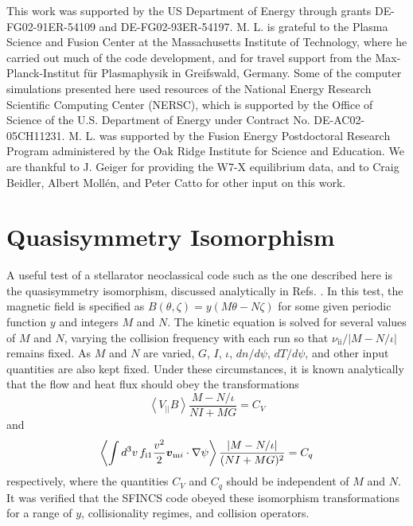 \documentclass[12pt,superscriptaddress]{revtex4}
\newcommand{\vect}[1]{\mbox{\boldmath $#1$}}
\newcommand{\nuii}{\nu_{\mathrm{ii}}}
\begin{document}
\begin{acknowledgments}
This work was supported by the US Department of Energy through grants DE-FG02-91ER-54109 and DE-FG02-93ER-54197.
M. L. is grateful to the Plasma Science and Fusion Center at the Massachusetts Institute of Technology,
where he carried out much of the code development, and for travel support from the
Max-Planck-Institut f\"{u}r Plasmaphysik in Greifswald, Germany.
Some of the computer simulations presented here
used resources of the National Energy Research Scientific Computing Center (NERSC),
which is supported by the Office of Science of the U.S. Department of Energy under Contract No. DE-AC02-05CH11231.
M. L. was supported by the
Fusion Energy Postdoctoral Research Program
administered by the Oak Ridge Institute for Science and Education.
We are thankful to J. Geiger for providing the W7-X equilibrium data,
and to Craig Beidler, Albert Moll\'{e}n, and Peter Catto for other input on this work.
\end{acknowledgments}


\appendix
\section{Quasisymmetry Isomorphism}

A useful test of a stellarator neoclassical code such as the one
described here is the quasisymmetry isomorphism,
discussed analytically in Refs. \cite{Pytte, Boozer83, meQS}.
In this test, the magnetic field is specified as $B(\theta,\zeta) = y(M\theta-N\zeta)$
for some given periodic function $y$ and integers $M$ and $N$.
The kinetic equation is solved for several values of $M$ and $N$,
varying the collision frequency with each run so that
$\nuii / \left|M - N/\iota \right|$ remains fixed.
As $M$ and $N$ are varied, $G$, $I$, $\iota$, $dn/d\psi$, $dT/d\psi$, and other input quantities are also kept fixed.
Under these circumstances, it is known analytically \cite{Pytte, Boozer83, meQS} that the flow
and heat flux should obey the transformations
\begin{equation}
\left< V_{||} B \right> \frac{M-N/\iota}{NI+MG} = C_V
\end{equation}
and
\begin{equation}
\left< \int d^3v\, f_{\mathrm{i}1} \frac{v^2}{2}\vect{v}_{\mathrm{m}i}\cdot\nabla\psi \right> \frac{\left| M-N/\iota\right| }{(NI+MG)^2} = C_q
\end{equation}
respectively, where the quantities $C_V$ and $C_q$ should be independent of $M$ and $N$.
It was verified that the SFINCS code obeyed these isomorphism transformations
for a range of $y$, collisionality regimes, and collision operators.
\end{document}
